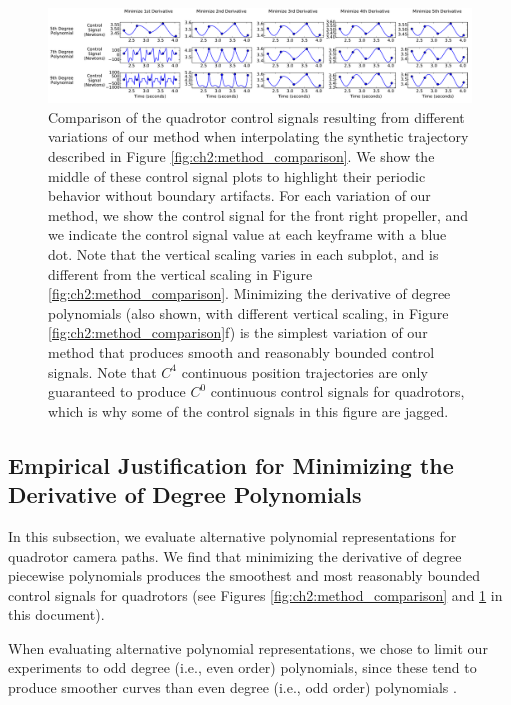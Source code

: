 \begin{figure}[t!]
\centering
\includegraphics[width=6.0in]{images/2015_siggraph_asia_supplementary/parameter_comparison}
\caption{
Comparison of the quadrotor control signals resulting from different variations of our method when interpolating the synthetic trajectory described in Figure \ref{fig:ch2:method_comparison}.
We show the middle of these control signal plots to highlight their periodic behavior without boundary artifacts.
For each variation of our method, we show the control signal for the front right propeller, and we indicate the control signal value at each keyframe with a blue dot. Note that the vertical scaling varies in each subplot, and is different from the vertical scaling in Figure \ref{fig:ch2:method_comparison}.
Minimizing the  derivative of  degree polynomials (also shown, with different vertical scaling, in Figure \ref{fig:ch2:method_comparison}f) is the simplest variation of our method that produces smooth and reasonably bounded control signals.
Note that  $C^4$ continuous position trajectories are only guaranteed to produce $C^0$ continuous control signals for quadrotors, which is why some of the control signals in this figure are jagged.
}
\label{fig:ch2:parameter_comparison}
\end{figure}

\subsection{Empirical Justification for Minimizing the  Derivative of  Degree Polynomials}
\label{sec:ch2:derivative_experiment}

In this subsection, we evaluate alternative polynomial representations for quadrotor camera paths.
We find that minimizing the  derivative of  degree piecewise polynomials produces the smoothest and most reasonably bounded control signals for quadrotors (see Figures \ref{fig:ch2:method_comparison} and \ref{fig:ch2:parameter_comparison} in this document).

When evaluating alternative polynomial representations, we chose to limit our experiments to odd degree (i.e., even order) polynomials, since these tend to produce smoother curves than even degree (i.e., odd order) polynomials \cite{goshtasby:1990}.


